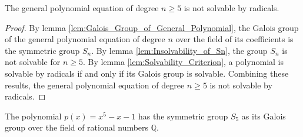 \begin{theorem}
    \label{thm:General_Abel-Ruffini}
    The general polynomial equation of degree $n \geq 5$ is not solvable by radicals.
\end{theorem}

\begin{proof}
    By lemma \ref{lem:Galois_Group_of_General_Polynomial}, the Galois group of the general polynomial equation of degree $n$ over the field of its coefficients is the symmetric group $S_n$.
    By lemma \ref{lem:Insolvability_of_Sn}, the group $S_n$ is not solvable for $n \geq 5$.
    By lemma \ref{lem:Solvability_Criterion}, a polynomial is solvable by radicals if and only if its Galois group is solvable.
    Combining these results, the general polynomial equation of degree $n \geq 5$ is not solvable by radicals.
\end{proof}

\begin{lemma}
    \label{lem:Quintic_with_S5_Galois_Group}
    The polynomial $p(x) = x^5 - x - 1$ has the symmetric group $S_5$ as its Galois group over the field of rational numbers $\mathbb{Q}$.
\end{lemma}

